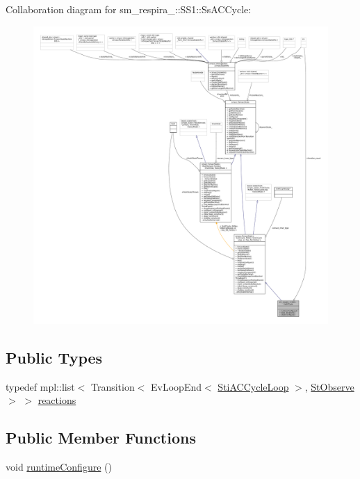Collaboration diagram for sm\+\_\+respira\+\_\+:\+:S\+S1\+:\+:Ss\+A\+C\+Cycle\+:
\nopagebreak
\begin{figure}[H]
\begin{center}
\leavevmode
\includegraphics[width=350pt]{structsm__respira__1_1_1SS1_1_1SsACCycle__coll__graph}
\end{center}
\end{figure}
\subsection*{Public Types}
\begin{DoxyCompactItemize}
\item 
typedef mpl\+::list$<$ Transition$<$ Ev\+Loop\+End$<$ \hyperlink{structsm__respira__1_1_1ac__cycle__inner__states_1_1StiACCycleLoop}{Sti\+A\+C\+Cycle\+Loop} $>$, \hyperlink{structsm__respira__1_1_1StObserve}{St\+Observe} $>$ $>$ \hyperlink{structsm__respira__1_1_1SS1_1_1SsACCycle_aaf8a711a309ca6d5f385b66010b74ff0}{reactions}
\end{DoxyCompactItemize}
\subsection*{Public Member Functions}
\begin{DoxyCompactItemize}
\item 
void \hyperlink{structsm__respira__1_1_1SS1_1_1SsACCycle_a930651fd0484925d6df0eff0a866b86b}{runtime\+Configure} ()
\end{DoxyCompactItemize}
